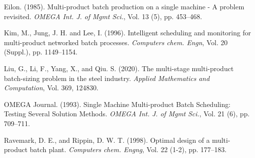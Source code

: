 \documentclass[preprint,12pt,authoryear]{elsarticle}
\begin{document}
\begin{thebibliography}{1}


Eilon. (1985). Multi-product batch production on a single machine - A problem revisited. {\it OMEGA Int. J. of Mgmt Sci.}, Vol. 13 (5), pp. 453--468.

Kim, M., Jung, J. H. and Lee, I. (1996). Intelligent scheduling and monitoring for multi-product networked batch processes. {\it  Computers chem. Engn}, Vol. 20 (Suppl.), pp. 1149--1154.

Liu, G., Li, F., Yang, X., and Qiu. S. (2020). The multi-stage multi-product batch-sizing problem in the steel industry. {\it  Applied Mathematics and Computation}, Vol. 369, 124830.

OMEGA Journal. (1993). Single Machine Multi-product Batch Scheduling: Testing Several Solution Methods. {\it  OMEGA Int. J. of Mgmt Sci.}, Vol. 21 (6), pp. 709--711.

Ravemark, D. E., and Rippin, D. W. T. (1998). Optimal design of a multi-product batch plant. {\it Computers chem. Engng}, Vol. 22 (1-2), pp. 177--183.

\end{thebibliography}
\end{document}
